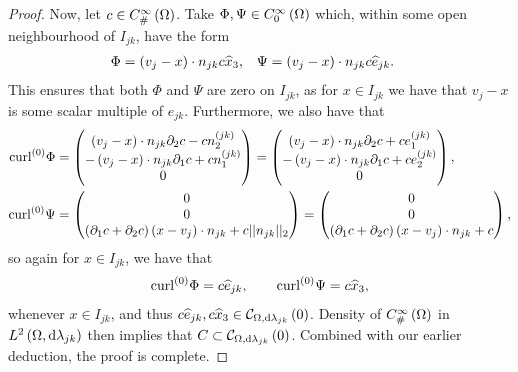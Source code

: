 \begin{proof}
	Now, let $c\in C^{\infty}_{\#}\left( \Omega \right)$.
	Take $\Phi, \Psi\in C^{\infty}_{0}\left( \Omega \right)$ which, within some open neighbourhood of $I_{jk}$, have the form
	\begin{align*}
		\Phi = \left( v_j - x \right)\cdot n_{jk} c\widehat{x}_3, &\quad
		\Psi = \left( v_j - x \right)\cdot n_{jk} c\widehat{e}_{jk}.
	\end{align*}
	This ensures that both $\Phi$ and $\Psi$ are zero on $I_{jk}$, as for $x\in I_{jk}$ we have that $v_j-x$ is some scalar multiple of $e_{jk}$.
	Furthermore, we also have that
	\begin{align*}
		\mathrm{curl}_{}^{(0)}\Phi &= \begin{pmatrix} \left( v_j-x \right)\cdot n_{jk} \partial_2 c - c n_2^{(jk)} \\ -\left( v_j-x \right)\cdot n_{jk} \partial_1 c + c n_1^{(jk)} \\ 0 \end{pmatrix}
		= \begin{pmatrix} \left( v_j-x \right)\cdot n_{jk} \partial_2 c + c e_1^{(jk)} \\ -\left( v_j-x \right)\cdot n_{jk} \partial_1 c + c e_2^{(jk)} \\ 0 \end{pmatrix}, \\
		\mathrm{curl}_{}^{(0)}\Psi &= \begin{pmatrix} 0 \\ 0 \\ \left( \partial_1 c + \partial_2 c \right)\left( x-v_j \right)\cdot n_{jk} + c\lvert\lvert n_{jk} \rvert\rvert_2 \end{pmatrix}
		= \begin{pmatrix} 0 \\ 0 \\ \left( \partial_1 c + \partial_2 c \right)\left( x-v_j \right)\cdot n_{jk} + c \end{pmatrix},
	\end{align*}
	so again for $x\in I_{jk}$, we have that
	\begin{align*}
		\mathrm{curl}_{}^{(0)}\Phi = c\widehat{e}_{jk}, \qquad \mathrm{curl}_{}^{(0)}\Psi = c\widehat{x}_3,
	\end{align*}
	whenever $x\in I_{jk}$, and thus $c\widehat{e}_{jk}, c\widehat{x}_3\in\mathcal{C}_{ \Omega, \mathrm{d}\lambda_{jk}}\left( 0 \right)$.
	Density of $C^{\infty}_{\#}\left( \Omega \right)$ in $L^{2}\left( \Omega,\mathrm{d} \lambda_{jk} \right)$ then implies that $C\subset\mathcal{C}_{ \Omega, \mathrm{d}\lambda_{jk}}\left( 0 \right)$.
	Combined with our earlier deduction, the proof is complete.
\end{proof}

